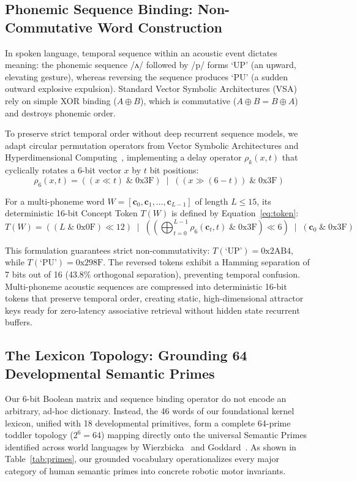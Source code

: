 \documentclass[journal,twocolumn]{IEEEtran}
\begin{document}
\subsection{Phonemic Sequence Binding: Non-Commutative Word Construction}
\label{sec:vsa}
In spoken language, temporal sequence within an acoustic event dictates meaning: the phonemic sequence /ʌ/ followed by /p/ forms `UP' (an upward, elevating gesture), whereas reversing the sequence produces `PU' (a sudden outward explosive expulsion). Standard Vector Symbolic Architectures (VSA) rely on simple XOR binding ($A \oplus B$), which is commutative ($A \oplus B = B \oplus A$) and destroys phonemic order.

To preserve strict temporal order without deep recurrent sequence models, we adapt circular permutation operators from Vector Symbolic Architectures and Hyperdimensional Computing~\cite{kanerva2009, eliasmith2012}, implementing a delay operator $\rho_k(x, t)$ that cyclically rotates a 6-bit vector $x$ by $t$ bit positions:
\begin{equation}
\rho_6(x, t) = ((x \ll t) \;\&\; 0\text{x}3\text{F}) \;\mid\; ((x \gg (6 - t)) \;\&\; 0\text{x}3\text{F})
\end{equation}

For a multi-phoneme word $W = [\mathbf{c}_0, \mathbf{c}_1, \dots, \mathbf{c}_{L-1}]$ of length $L \le 15$, its deterministic 16-bit Concept Token $T(W)$ is defined by Equation~\ref{eq:token}:
\begin{equation}
\label{eq:token}
T(W) = \left((L \;\&\; 0\text{x}0\text{F}) \ll 12\right) \;\mid\; \left(\left(\bigoplus_{t=0}^{L-1} \rho_6(\mathbf{c}_t, t) \;\&\; 0\text{x}3\text{F}\right) \ll 6\right) \;\mid\; (\mathbf{c}_0 \;\&\; 0\text{x}3\text{F})
\end{equation}

This formulation guarantees strict non-commutativity: $T(\text{`UP'}) = 0\text{x}2\text{AB}4$, while $T(\text{`PU'}) = 0\text{x}298\text{F}$. The reversed tokens exhibit a Hamming separation of 7 bits out of 16 (43.8\% orthogonal separation), preventing temporal confusion. Multi-phoneme acoustic sequences are compressed into deterministic 16-bit tokens that preserve temporal order, creating static, high-dimensional attractor keys ready for zero-latency associative retrieval without hidden state recurrent buffers.

\subsection{The Lexicon Topology: Grounding 64 Developmental Semantic Primes}
Our 6-bit Boolean matrix and sequence binding operator do not encode an arbitrary, ad-hoc dictionary. Instead, the 46 words of our foundational kernel lexicon, unified with 18 developmental primitives, form a complete 64-prime toddler topology ($2^6 = 64$) mapping directly onto the universal Semantic Primes identified across world languages by Wierzbicka~\cite{wierzbicka1996} and Goddard~\cite{goddard2002}. As shown in Table~\ref{tab:primes}, our grounded vocabulary operationalizes every major category of human semantic primes into concrete robotic motor invariants.
\end{document}
